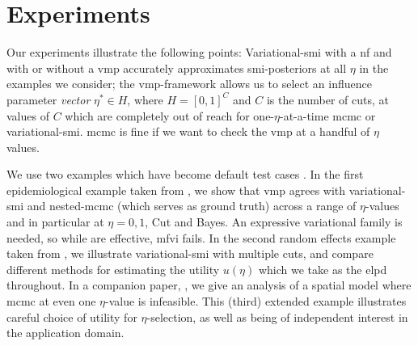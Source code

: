 

\section{Experiments} \label{sec:experiments}

Our experiments illustrate the following points: Variational-\acrshort*{smi} with a \acrshort*{nf} and with or without a \acrshort*{vmp} accurately approximates \acrshort*{smi}-posteriors at all $\eta$ in the examples we consider; the \acrshort*{vmp}-framework allows us to select an influence parameter \emph{vector} $\eta^*\in H$, where $H=[0,1]^C$ and $C$ is the number of cuts, at values of $C$ which are completely out of reach for one-$\eta$-at-a-time \acrshort*{mcmc} or variational-\acrshort*{smi}.
\acrshort*{mcmc} is fine if we want to check the \acrshort*{vmp} at a handful of $\eta$ values. %

We use two examples which have become default test cases \citep[e.g.][]{Plummer2015cut,Jacob2017together,Carmona2020smi,Liu2020sacut,Nicholls2022smi}. In the first epidemiological example taken from \cite{Plummer2015cut}, we show that \acrshort*{vmp} agrees with variational-\acrshort*{smi} and nested-\acrshort*{mcmc} (which serves as ground truth) across a range of $\eta$-values and in particular at $\eta=0,1$, Cut and Bayes.  An expressive variational family is needed, so while  are effective, \acrshort*{mfvi} fails.  In the second random effects example taken from \cite{Jacob2017together}, we illustrate variational-\acrshort*{smi} with multiple cuts,
and compare different methods for estimating the utility $u(\eta)$ which we take as the \acrshort*{elpd} throughout.
In a companion paper, \cite{Carmona2022spatial}, we give an analysis of a spatial model where \acrshort*{mcmc} at even one $\eta$-value is infeasible. This (third) extended example illustrates careful choice of utility for $\eta$-selection, as well as being of independent interest in the application domain.

